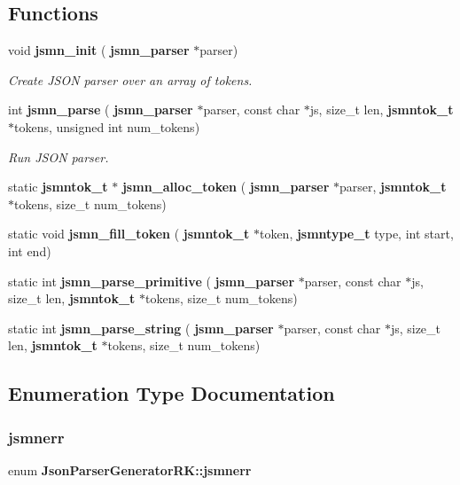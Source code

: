 \subsection*{Functions}
\begin{DoxyCompactItemize}
\item 
void \textbf{ jsmn\+\_\+init} (\textbf{ jsmn\+\_\+parser} $\ast$parser)
\begin{DoxyCompactList}\small\item\em Create J\+S\+ON parser over an array of tokens. \end{DoxyCompactList}\item 
int \textbf{ jsmn\+\_\+parse} (\textbf{ jsmn\+\_\+parser} $\ast$parser, const char $\ast$js, size\+\_\+t len, \textbf{ jsmntok\+\_\+t} $\ast$tokens, unsigned int num\+\_\+tokens)
\begin{DoxyCompactList}\small\item\em Run J\+S\+ON parser. \end{DoxyCompactList}\item 
static \textbf{ jsmntok\+\_\+t} $\ast$ \textbf{ jsmn\+\_\+alloc\+\_\+token} (\textbf{ jsmn\+\_\+parser} $\ast$parser, \textbf{ jsmntok\+\_\+t} $\ast$tokens, size\+\_\+t num\+\_\+tokens)
\item 
static void \textbf{ jsmn\+\_\+fill\+\_\+token} (\textbf{ jsmntok\+\_\+t} $\ast$token, \textbf{ jsmntype\+\_\+t} type, int start, int end)
\item 
static int \textbf{ jsmn\+\_\+parse\+\_\+primitive} (\textbf{ jsmn\+\_\+parser} $\ast$parser, const char $\ast$js, size\+\_\+t len, \textbf{ jsmntok\+\_\+t} $\ast$tokens, size\+\_\+t num\+\_\+tokens)
\item 
static int \textbf{ jsmn\+\_\+parse\+\_\+string} (\textbf{ jsmn\+\_\+parser} $\ast$parser, const char $\ast$js, size\+\_\+t len, \textbf{ jsmntok\+\_\+t} $\ast$tokens, size\+\_\+t num\+\_\+tokens)
\end{DoxyCompactItemize}


\subsection{Enumeration Type Documentation}
\mbox{\label{namespace_json_parser_generator_r_k_ab03a941ba316b9487a16636e6db43edf}} 
\subsubsection{jsmnerr}
{\footnotesize\ttfamily enum \textbf{ Json\+Parser\+Generator\+R\+K\+::jsmnerr}}



